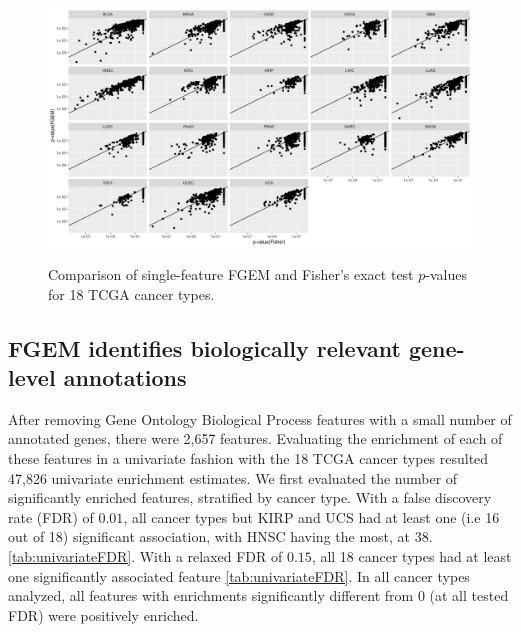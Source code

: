 \begin{figure}
\centering
\includegraphics[width=.9\linewidth]{img/fisher_vs_fgem.png}\label{fig:fisher_vs_fgem}
\caption{Comparison of single-feature FGEM and Fisher's exact test $p$-values for 18 TCGA cancer types.}
\end{figure}

\subsection{FGEM identifies biologically relevant gene-level annotations}\label{sec:orgd52f2ca}

After removing Gene Ontology Biological Process features with a small number of annotated genes, there were 2,657 features.  Evaluating the enrichment of each of these features in a univariate fashion with the 18 TCGA cancer types resulted 47,826 univariate enrichment estimates.  We first evaluated the number of significantly enriched features, stratified by cancer type.  With a false discovery rate (FDR) of $0.01$, all cancer types but KIRP and UCS had at least one (i.e 16 out of 18) significant association, with HNSC having the most, at 38. \ref{tab:univariateFDR}.  With a relaxed FDR of $0.15$, all 18 cancer types had at least one significantly associated feature \ref{tab:univariateFDR}. In all cancer types analyzed, all features with enrichments significantly different from 0 (at all tested FDR)  were positively enriched.  


